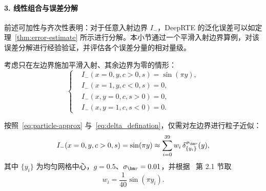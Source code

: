 \paragraph{3. 线性组合与误差分解}
前述可加性与齐次性表明：对于任意入射边界 $I_{-}$，DeepRTE 的泛化误差可以如定理~\ref{thm:error-estimate} 所示进行分解。本小节通过一个平滑入射边界算例，对该误差分解进行经验验证，并评估各个误差分量的相对量级。

考虑只在左边界施加平滑入射、其余边界为零的情形：
\begin{equation}
    \left \{ %
    \begin{aligned}
         & I_-(x=0,y,c>0,s) = \sin(\pi y), \\
         & I_-(x=1,y,c<0,s) = 0,           \\
         & I_-(x,y=0,c,s>0) = 0,           \\
         & I_-(x,y=1,c,s<0) = 0.
    \end{aligned}
    \right. %
\end{equation}

按照~\eqref{eq:particle-approx} 与~\eqref{eq:delta_defination}，仅需对左边界进行粒子近似：
\begin{equation}
    I_-(x=0,y,c>0,s) = \sin(\pi y) \approx \sum_{i=0}^{39} w_{i} \,\delta^{\sigma_{\br}}_{\{y_i\}}(y),
\end{equation}
其中 $\{y_i\}$ 为均匀网格中心，$g=0.5$、$\sigma_{\br} = 0.01$，并根据~\cite{chertock2017practical} 第 2.1 节取
\begin{equation}
    w_i=\frac{1}{40}\sin(\pi y_i).
\end{equation}

